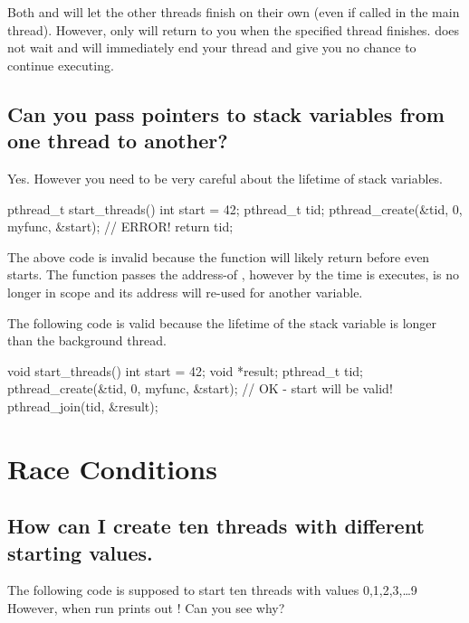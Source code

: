 Both  and  will let the other threads finish on their own (even if called in the main thread). However, only  will return to you when the specified thread finishes.  does not wait and will immediately end your thread and give you no chance to continue executing.

\subsection{Can you pass pointers to stack variables from one thread to another?}\label{can-you-pass-pointers-to-stack-variables-from-one-thread-to-another}

Yes. However you need to be very careful about the lifetime of stack variables.

\begin{code}
pthread_t start_threads() {
  int start = 42;
  pthread_t tid;
  pthread_create(&tid, 0, myfunc, &start); // ERROR!
  return tid;
}
\end{code}

The above code is invalid because the function  will likely return before  even starts. The function passes the address-of , however by the time  is executes,  is no longer in scope and its address will re-used for another variable.

The following code is valid because the lifetime of the stack variable is longer than the background thread.

\begin{code}
void start_threads() {
  int start = 42;
  void *result;
  pthread_t tid;
  pthread_create(&tid, 0, myfunc, &start); // OK - start will be valid!
  pthread_join(tid, &result);
}
\end{code}

\section{Race Conditions}\label{intro-to-race-conditions}

\subsection{How can I create ten threads with different starting values.}\label{how-can-i-create-ten-threads-with-different-starting-values.}

The following code is supposed to start ten threads with values 0,1,2,3,\ldots{}9 However, when run prints out ! Can you see why?

